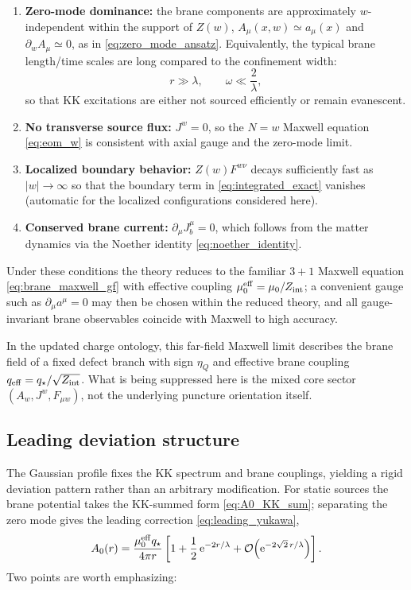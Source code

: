 \documentclass[11pt]{article}
\newcommand{\ee}{\mathrm e}
\newcommand{\A}{A}
\newcommand{\F}{F}
\newcommand{\J}{J}
\newcommand{\Z}{Z}
\newcommand{\lam}{\lambda}      %
\newcommand{\Zint}{Z_{\rm int}} %
\newcommand{\etaQ}{\eta_Q}
\newcommand{\qstar}{q_\star}
\newcommand{\qeff}{q_{\rm eff}}
\newcommand{\muo}{\mu_0}
\newcommand{\mueff}{\mu_0^{\rm eff}}
\begin{document}
\begin{enumerate}
\item \textbf{Zero-mode dominance:} the brane components are approximately
\(w\)-independent within the support of \(\Z(w)\),
\(\A_\mu(x,w)\simeq a_\mu(x)\) and \(\partial_w \A_\mu\simeq 0\), as in
\cref{eq:zero_mode_ansatz}. Equivalently, the typical brane length/time scales
are long compared to the confinement width:
\begin{equation}
  r \gg \lam,
  \qquad
  \omega \ll \frac{2}{\lam},
\end{equation}
so that KK excitations are either not sourced efficiently or remain evanescent.

\item \textbf{No transverse source flux:} \(\J^w=0\), so the \(N=w\) Maxwell
equation \cref{eq:eom_w} is consistent with axial gauge and the zero-mode limit.

\item \textbf{Localized boundary behavior:} \(\Z(w)\F^{w\nu}\) decays sufficiently
fast as \(|w|\to\infty\) so that the boundary term in \cref{eq:integrated_exact}
vanishes (automatic for the localized configurations considered here).

\item \textbf{Conserved brane current:} \(\partial_\mu \J_b^\mu=0\), which follows
from the matter dynamics via the Noether identity \cref{eq:noether_identity}.
\end{enumerate}

Under these conditions the theory reduces to the familiar \(3+1\) Maxwell
equation \cref{eq:brane_maxwell_gf} with effective coupling
\(\mueff=\muo/\Zint\); a convenient gauge such as \(\partial_\mu a^\mu=0\) may
then be chosen within the reduced theory, and all gauge-invariant brane
observables coincide with Maxwell to high accuracy.

In the updated charge ontology, this far-field Maxwell limit describes the brane
field of a fixed defect branch with sign \(\etaQ\) and effective brane coupling
\(\qeff=\qstar/\sqrt{\Zint}\). What is being suppressed here is the mixed core
sector \((A_w,J^w,F_{\mu w})\), not the underlying puncture orientation itself.

\subsection{Leading deviation structure}
The Gaussian profile fixes the KK spectrum and brane couplings, yielding a rigid
deviation pattern rather than an arbitrary modification. For static sources the
brane potential takes the KK-summed form \cref{eq:A0_KK_sum}; separating the zero
mode gives the leading correction \cref{eq:leading_yukawa},
\begin{equation}
  A_0(r)=\frac{\mueff \qstar}{4\pi r}
  \left[1+\frac12\,\ee^{-2r/\lam}
  +\mathcal O\!\left(\ee^{-2\sqrt2\,r/\lam}\right)\right].
\end{equation}
Two points are worth emphasizing:
\end{document}

